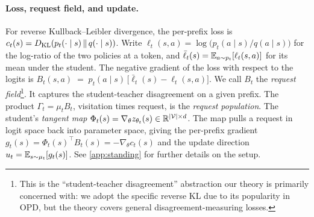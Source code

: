 \paragraph{Loss, request field, and update.}
\label{def:features}
For reverse Kullback--Leibler divergence, the per-prefix loss is $c_t(s)=D_{\mathrm{KL}}\!\left(p_t(\cdot\mid s) \,\Vert\, q(\cdot\mid s)\right)$. Write $\ell_t(s,a) = \log\big(p_t(a \mid s)/q(a \mid s)\big)$ for the log-ratio of the two policies at a token, and $\bar\ell_t(s) = \mathbb{E}_{a \sim p_t}[\ell_t(s,a)]$ for its mean under the student. The negative gradient of the loss with respect to the logits is
$B_t(s,a) \;=\; p_t(a \mid s)\,\big[\bar{\ell}_t(s) - \ell_t(s,a)\big]$.
We call $B_t$ the \emph{request field}\footnote{This is the ``student-teacher disagreement'' abstraction our theory is primarily concerned with: we adopt the specific reverse KL due to its popularity in OPD, but the theory covers general disagreement-measuring losses.}. It captures the student-teacher disagreement on a given prefix. The product $\Gamma_t = \mu_t B_t$, visitation times request, is the \emph{request population}. The student's \emph{tangent map} $\Phi_t(s) = \nabla_\theta z_{\theta_t}(s) \in \mathbb{R}^{|\mathcal{V}| \times d}$. The map pulls a request in logit space back into parameter space, giving the per-prefix gradient $g_t(s) = \Phi_t(s)^{\!\top} B_t(s) = -\nabla_\theta c_t(s)$ and the update direction $u_t = \mathbb{E}_{s \sim \mu_t}[g_t(s)]$. See \cref{app:standing} for further details on the setup.

